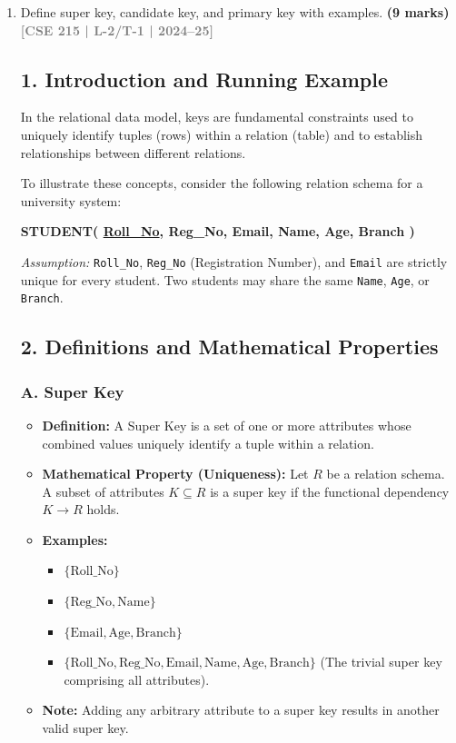 \documentclass[12pt,a3paper]{article}
\newcommand{\yr}[1]{\hfill\textcolor{gray}{\small\textbf{[#1]}}}
\newcommand{\mk}[1]{\textcolor{orange!70!black}{\small\textbf{(#1 marks)}}}
\begin{document}
\begin{enumerate}

\item Define super key, candidate key, and primary key with examples.
\mk{9} \yr{CSE 215 | L-2/T-1 | 2024--25}

\begin{tcolorbox}[enhanced,breakable,ansbox,colback=cA!4,colframe=cA,boxrule=0.8pt,arc=5pt,title={\textbf{Answer}},fonttitle=\bfseries\color{white},colbacktitle=cA]

\subsection*{1. Introduction and Running Example}
In the relational data model, keys are fundamental constraints used to uniquely identify tuples (rows) within a relation (table) and to establish relationships between different relations. 

To illustrate these concepts, consider the following relation schema for a university system:
\begin{center}
    \textbf{STUDENT( \underline{Roll\_No}, Reg\_No, Email, Name, Age, Branch )}
\end{center}
\textit{Assumption:} \texttt{Roll\_No}, \texttt{Reg\_No} (Registration Number), and \texttt{Email} are strictly unique for every student. Two students may share the same \texttt{Name}, \texttt{Age}, or \texttt{Branch}.

\subsection*{2. Definitions and Mathematical Properties}

\subsubsection*{A. Super Key}
\begin{itemize}
    \item \textbf{Definition:} A Super Key is a set of one or more attributes whose combined values uniquely identify a tuple within a relation.
    \item \textbf{Mathematical Property (Uniqueness):} Let $R$ be a relation schema. A subset of attributes $K \subseteq R$ is a super key if the functional dependency $K \rightarrow R$ holds.
    \item \textbf{Examples:} 
    \begin{itemize}
        \item $\{\text{Roll\_No}\}$
        \item $\{\text{Reg\_No}, \text{Name}\}$
        \item $\{\text{Email}, \text{Age}, \text{Branch}\}$
        \item $\{\text{Roll\_No}, \text{Reg\_No}, \text{Email}, \text{Name}, \text{Age}, \text{Branch}\}$ (The trivial super key comprising all attributes).
    \end{itemize}
    \item \textbf{Note:} Adding any arbitrary attribute to a super key results in another valid super key.
\end{itemize}


\end{tcolorbox}
\end{enumerate}
\end{document}
